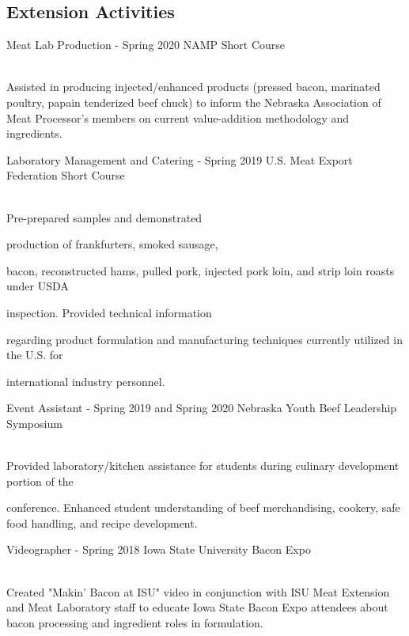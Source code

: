 \documentclass{tccv}
\begin{document}
\newpage
\begin{eventlist}
\section{Extension Activities}

\item{}
    {Meat Lab Production - Spring 2020}
     {NAMP Short Course}

\\
Assisted in producing injected/enhanced products (pressed bacon, marinated poultry, papain tenderized beef chuck) to inform the Nebraska Association of Meat Processor's members on current value-addition methodology and ingredients.





\item{}
    {Laboratory Management and Catering - Spring 2019}
     {U.S. Meat Export Federation Short Course}

\\

Pre-prepared samples and demonstrated

production of frankfurters, smoked sausage,

bacon, reconstructed hams, pulled pork, injected pork loin, and strip loin roasts under USDA

inspection. Provided technical information

regarding product formulation and manufacturing techniques currently utilized in the U.S. for

international industry personnel.

\item{}
    {Event Assistant - Spring 2019 and Spring 2020}
     {Nebraska Youth Beef
     Leadership \\Symposium}

\\
Provided laboratory/kitchen assistance for students during culinary development portion of the

conference. Enhanced student understanding of beef merchandising, cookery, safe food handling, and recipe development.

\item{}
    {Videographer - Spring 2018}
     {Iowa State University Bacon Expo}

\\

Created "Makin' Bacon at ISU" video in conjunction with ISU Meat Extension and Meat Laboratory staff to educate Iowa State Bacon Expo attendees about bacon processing and ingredient roles in formulation.



\end{eventlist}
\end{document}
